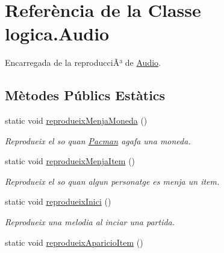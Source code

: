 \hypertarget{classlogica_1_1_audio}{\section{Referència de la Classe logica.\+Audio}
\label{classlogica_1_1_audio}
}


Encarregada de la reproducciÃ³ de \hyperlink{classlogica_1_1_audio}{Audio}.  


\subsection*{Mètodes Públics Estàtics}
\begin{DoxyCompactItemize}
\item 
\hypertarget{classlogica_1_1_audio_a36e406167c180e2bdb7c646c7a4c645d}{static void \hyperlink{classlogica_1_1_audio_a36e406167c180e2bdb7c646c7a4c645d}{reprodueix\+Menja\+Moneda} ()}\label{classlogica_1_1_audio_a36e406167c180e2bdb7c646c7a4c645d}

\begin{DoxyCompactList}\small\item\em Reprodueix el so quan \hyperlink{classlogica_1_1_pacman}{Pacman} agafa una moneda. \end{DoxyCompactList}\item 
\hypertarget{classlogica_1_1_audio_a6a897d93efd13a0c96d4518bf7e041c0}{static void \hyperlink{classlogica_1_1_audio_a6a897d93efd13a0c96d4518bf7e041c0}{reprodueix\+Menja\+Item} ()}\label{classlogica_1_1_audio_a6a897d93efd13a0c96d4518bf7e041c0}

\begin{DoxyCompactList}\small\item\em Reprodueix el so quan algun personatge es menja un item. \end{DoxyCompactList}\item 
\hypertarget{classlogica_1_1_audio_a5079c1c587da3b4bf704b5e20314b0c5}{static void \hyperlink{classlogica_1_1_audio_a5079c1c587da3b4bf704b5e20314b0c5}{reprodueix\+Inici} ()}\label{classlogica_1_1_audio_a5079c1c587da3b4bf704b5e20314b0c5}

\begin{DoxyCompactList}\small\item\em Reprodueix una melodia al inciar una partida. \end{DoxyCompactList}\item 
\hypertarget{classlogica_1_1_audio_af34af5f6c05baea4b1044beda801581b}{static void \hyperlink{classlogica_1_1_audio_af34af5f6c05baea4b1044beda801581b}{reprodueix\+Aparicio\+Item} ()}\label{classlogica_1_1_audio_af34af5f6c05baea4b1044beda801581b}


\end{DoxyCompactItemize}

